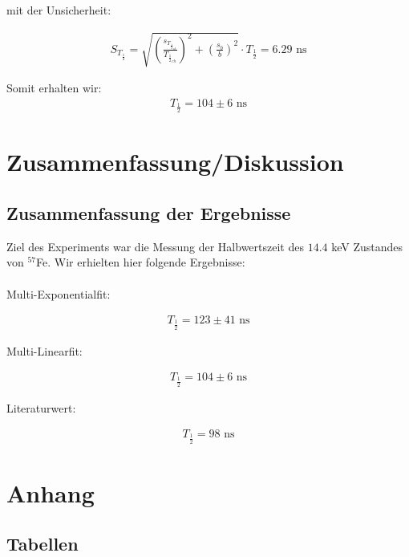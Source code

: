 \documentclass[12pt]{article}
\begin{document}
mit der Unsicherheit:

\begin{align*}
S_{T_{\frac12}} = \sqrt{\left(\frac{s_{T_{{\frac12}_{ch}}}}{T_{{\frac12}_{ch}}}\right)^2+\left(\frac{s_b}{b}\right)^2} \cdot T_{\frac12} = 6.29 \text{ ns}
\end{align*}

Somit erhalten wir:
\begin{align*}
T_{\frac12} = 104 \pm 6 \text{ ns}
\end{align*}

\section{Zusammenfassung/Diskussion}

\subsection{Zusammenfassung der Ergebnisse}

Ziel des Experiments war die Messung der Halbwertszeit des $14.4$ keV Zustandes von $^{57}$Fe. Wir erhielten hier folgende Ergebnisse:\\
\\
Multi-Exponentialfit: 

\begin{align*}
T_{\frac12} = 123 \pm 41 \text{ ns}
\end{align*}

Multi-Linearfit:

\begin{align*}
T_{\frac12} = 104 \pm 6 \text{ ns}
\end{align*}

Literaturwert: 

\begin{align*}
T_{\frac12} = 98 \text{ ns}
\end{align*}



\newpage
\section{Anhang}

\subsection{Tabellen}

%
\end{document}
